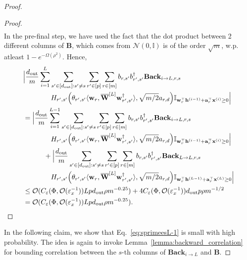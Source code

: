 \begin{claim}
\begin{proof}
\begin{proof}
\begin{align*}
					\end{align*}
					In the pre-final step, we have used the fact that the dot product between 2 different columns of $\mathbf{B}$, which comes from $\mathcal{N}(0, \mathbb{I})$ is of the order $\sqrt{m}$, w.p. atleast $1-e^{-\Omega(\rho^2)}$.
					\endgroup
					Hence, 
					\begingroup \allowdisplaybreaks
					\begin{align*}
						&\Big|\frac{d_{\mathrm{out}} }{m} \sum_{i=1}^{L}  \sum_{s' \in [d_{\mathrm{out}} ]: s' \ne s} \sum_{r' \in [p]} \sum_{r \in [m]}  b_{r, s'} b_{r', s'}^{\dagger} \mathbf{Back}_{i \to L, r, s} \\& \quad \quad \quad \quad H_{r', s'}\Big(\theta_{r', s'} \langle \mathbf{w}_{r}, \overline{\mathbf{W}}^{[L]} \mathbf{w}_{r', s'}^{\dagger}\rangle , \sqrt{m/2} a_{r, d}\Big) \mathbb{I}_{\mathbf{w}_r^{\top} \mathbf{h}^{(i-1)} + \mathbf{a}_r^{\top} \mathbf{x}^{(i)} \ge 0}\Big| 
						\\& = \Big|\frac{d_{\mathrm{out}} }{m} \sum_{i=1}^{L-1}  \sum_{s' \in [d_{\mathrm{out}} ]: s' \ne s} \sum_{r' \in [p]} \sum_{r \in [m]}  b_{r, s'} b_{r', s'}^{\dagger} \mathbf{Back}_{i \to L, r, s} \\& \quad \quad \quad \quad H_{r', s'}\Big(\theta_{r', s'} \langle \mathbf{w}_{r}, \overline{\mathbf{W}}^{[L]} \mathbf{w}_{r', s'}^{\dagger}\rangle , \sqrt{m/2} a_{r, d}\Big) \mathbb{I}_{\mathbf{w}_r^{\top} \mathbf{h}^{(i-1)} + \mathbf{a}_r^{\top} \mathbf{x}^{(i)} \ge 0}\Big| 
						\\ &\quad \quad \quad + \Big|\frac{d_{\mathrm{out}} }{m}   \sum_{s' \in [d_{\mathrm{out}} ]: s' \ne s} \sum_{r' \in [p]} \sum_{r \in [m]}  b_{r, s'} b_{r', s'}^{\dagger} \mathbf{Back}_{L \to L, r, s} \\& \quad \quad \quad \quad H_{r', s'}\Big(\theta_{r', s'} \langle \mathbf{w}_{r}, \overline{\mathbf{W}}^{[L]} \mathbf{w}_{r', s'}^{\dagger}\rangle , \sqrt{m/2} a_{r, d}\Big) \mathbb{I}_{\mathbf{w}_r^{\top} \mathbf{h}^{(L-1)} + \mathbf{a}_r^{\top} \mathbf{x}^{(L)} \ge 0}\Big|
						\\&\le  \mathcal{O}(C_\varepsilon(\Phi, \mathcal{O}( \varepsilon_x^{-1})) L p d_{\mathrm{out}} \rho m^{-0.25}) + 4 C_\varepsilon(\Phi, \mathcal{O}( \varepsilon_x^{-1}))  d_{\mathrm{out}} p \rho m^{-1/2} \\&= \mathcal{O}(C_\varepsilon(\Phi, \mathcal{O}( \varepsilon_x^{-1})) L p d_{\mathrm{out}} \rho m^{-0.25}).
					\end{align*}
					\endgroup
				\end{proof}
				\fi
				
				In the following claim, we show that Eq.~\ref{eq:sprimeesL-1} is small with high probability. The idea is again to invoke Lemma~\ref{lemma:backward_correlation} for bounding correlation between the $s$-th columns of $\mathbf{Back}_{i \to L}$ and $\mathbf{B}$.
				

\end{proof}
\end{claim}
